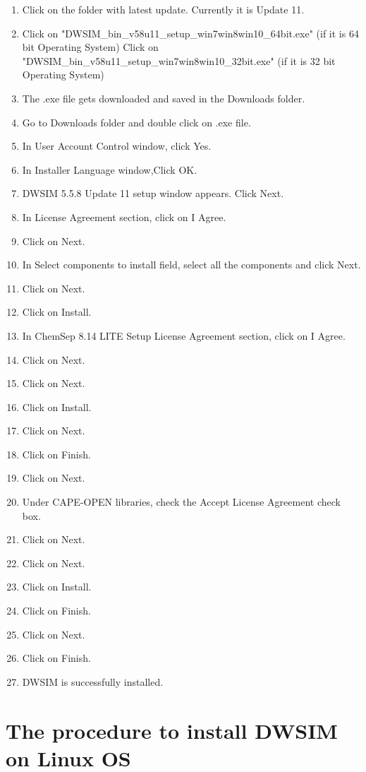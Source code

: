 \documentclass[12pt,a4paper]{article}
\begin{document}
\begin{enumerate}
\item Click on the folder with latest update. Currently it is Update 11.
\item Click on "DWSIM\_bin\_v58u11\_setup\_win7win8win10\_64bit.exe" (if it is 64 bit Operating System)
\newline Click on "DWSIM\_bin\_v58u11\_setup\_win7win8win10\_32bit.exe" (if it is 32 bit Operating System)
\item The .exe file gets downloaded and saved in the Downloads folder.
\item Go to Downloads folder and double click on .exe file.
\item In User Account Control window, click Yes.
\item In Installer Language window,Click OK.
\item DWSIM 5.5.8 Update 11 setup window appears. Click Next.
\item In License Agreement section, click on I Agree.
\item Click on Next.
\item In Select components to install field, select all the components and click Next.
\item Click on Next.
\item Click on Install.
\item In ChemSep 8.14 LITE Setup License Agreement section, click on I Agree.
\item Click on Next.
\item Click on Next.
\item Click on Install.
\item Click on Next.
\item Click on Finish.
\item Click on Next.
\item Under CAPE-OPEN libraries, check the Accept License Agreement check box.
\item Click on Next.
\item Click on Next.
\item Click on Install.
\item Click on Finish.
\item Click on Next.
\item Click on Finish.
\item DWSIM is successfully installed.

\end{enumerate}

\section{The procedure to install DWSIM on Linux OS}
\end{document}
